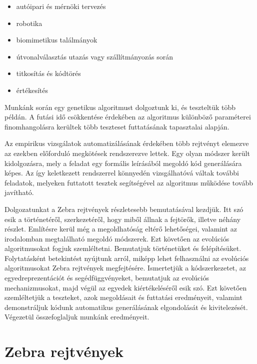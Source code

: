\documentclass[12pt,a4paper,oneside]{report}
\begin{document}

	\begin{itemize}
        \item autóipari és mérnöki tervezés
        \item robotika
        \item biomimetikus találmányok
        \item útvonalválasztás utazás vagy szállítmányozás során
        \item titkosítás és kódtörés
        \item értékesítés
	\end{itemize}

    
    Munkánk során egy genetikus algoritmust dolgoztunk ki, és teszteltük több példán.
    A futási idő csökkentése érdekében az algoritmus különböző paraméterei finomhangolásra kerültek több teszteset futtatásának tapasztalai alapján.

	Az empirikus vizsgálatok automatizálásának érdekében több rejtvényt elemezve az ezekben előforduló megkötések rendszerezve lettek.
    Egy olyan módszer került kidolgozásra, mely a feladat egy formális leírásából megoldó kód generálására képes.
    Az így keletkezett rendszerrel könnyedén vizsgálhatóvá váltak további feladatok, melyeken futtatott tesztek segítségével az algoritmus működése tovább javítható.

	Dolgozatunkat a Zebra rejtvények részletesebb bemutatásával kezdjük.
    Itt szó esik a történetéről, szerkezetéről, hogy miből állnak a fejtörők, illetve néhány részlet.
    Említésre kerül még a megoldhatóság eltérő lehetőségei, valamint az irodalomban megtalálható megoldó módszerek. Ezt követően az evolúciós algoritmusokat fogjuk szemléltetni.
    Bemutatjuk történetüket és felépítésüket.
    Folytatásként betekintést nyújtunk arról, miképp lehet felhasználni az evolúciós algoritmusokat Zebra rejtvények megfejtésére.
    Ismertetjük a kódszerkezetet, az egyedreprezentációt és segédfüggvényeket, bemutatjuk az evolúciós mechanizmusokat, majd végül az egyedek kiértékeléséről esik szó.
    Ezt követően szemléltetjük a teszteket, azok megoldásait és futtatási eredményeit, valamint demonstráljuk kódunk automatikus generálásának elgondolását és kivitelezését.
    Végezetül összefoglaljuk munkánk eredményeit.

\chapter{Zebra rejtvények} %
\end{document}
